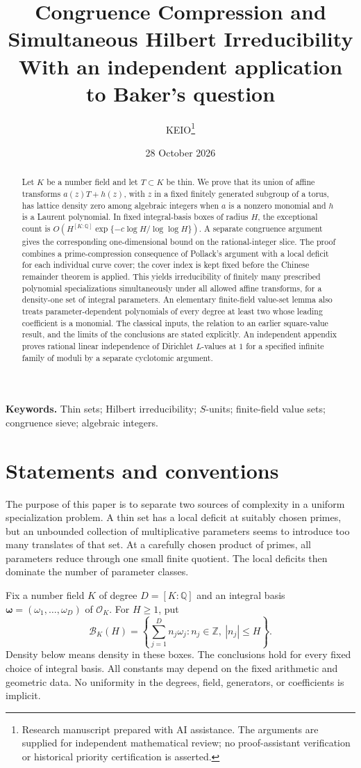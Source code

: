 \documentclass[11pt,a4paper]{article}
\title{\bfseries Congruence Compression and\\Simultaneous Hilbert Irreducibility\\[5pt]\large With an independent application to Baker's question}
\author{KEIO\thanks{Research manuscript prepared with AI assistance. The arguments are supplied for independent mathematical review; no proof-assistant verification or historical priority certification is asserted.}}
\date{28 October 2026}
\theoremstyle{definition}
\theoremstyle{remark}
\newcommand{\Q}{\mathbb Q}
\newcommand{\Z}{\mathbb Z}
\newcommand{\OK}{\mathcal O_K}
\newcommand{\cB}{\mathcal B}
\begin{document}
\maketitle
\begin{abstract}
Let $K$ be a number field and let $T\subset K$ be thin. We prove that
its union of affine transforms $a(z)T+h(z)$, with $z$ in a fixed finitely
generated subgroup of a torus, has lattice density zero among algebraic
integers when $a$ is a nonzero monomial and $h$ is a Laurent polynomial.
In fixed integral-basis boxes of radius $H$, the exceptional count is
$O(H^{[K:\Q]}\exp\{-c\log H/\log\log H\})$. A separate congruence argument
gives the corresponding one-dimensional bound on the rational-integer
slice. The proof combines a prime-compression consequence of Pollack's
argument with a local deficit for each individual curve cover; the cover
index is kept fixed before the Chinese remainder theorem is applied.
This yields irreducibility of finitely many prescribed polynomial
specializations simultaneously under all allowed affine transforms, for
a density-one set of integral parameters. An elementary finite-field
value-set lemma also treats parameter-dependent polynomials of every
degree at least two whose leading coefficient is a monomial. The
classical inputs, the relation to an earlier square-value result, and
the limits of the conclusions are stated explicitly. An independent appendix proves rational linear independence of Dirichlet $L$-values at $1$ for a specified infinite family of moduli by a separate cyclotomic argument.
\end{abstract}

\noindent\textbf{Keywords.} Thin sets; Hilbert irreducibility; $S$-units;
finite-field value sets; congruence sieve; algebraic integers.

\section{Statements and conventions}

The purpose of this paper is to separate two sources of complexity in a
uniform specialization problem. A thin set has a local deficit at suitably
chosen primes, but an unbounded collection of multiplicative parameters
seems to introduce too many translates of that set. At a carefully chosen
product of primes, all parameters reduce through one small finite quotient.
The local deficits then dominate the number of parameter classes.

Fix a number field $K$ of degree $D=[K:\Q]$ and an integral basis
$\boldsymbol\omega=(\omega_1,\ldots,\omega_D)$ of $\OK$. For $H\ge1$, put
\[
 \cB_K(H)=\left\{\sum_{j=1}^D n_j\omega_j:
          n_j\in\Z,\ |n_j|\le H\right\}.
\]
Density below means density in these boxes. The conclusions hold for every
fixed choice of integral basis. All constants may depend on the fixed
arithmetic and geometric data. No uniformity in the degrees, field,
generators, or coefficients is implicit.
\end{document}
